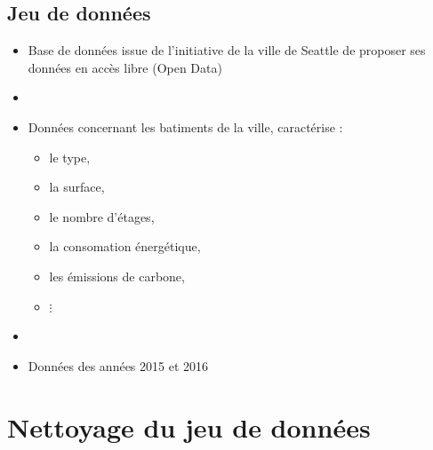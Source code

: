 \documentclass[8pt,aspectratio=169,hyperref={unicode=true}]{beamer}
\begin{document}
\subsection{Jeu de données}
\begin{frame}{\insertsubsection}
  \begin{itemize}
    \item Base de données issue de l'initiative de la ville de Seattle de proposer ses
          données en accès libre (Open Data)
    \item[]
    \item Données concernant les batiments de la ville, caractérise :
          \begin{itemize}
            \item le type,
            \item la surface,
            \item le nombre d'étages,
            \item la consomation énergétique,
            \item les émissions de carbone,
            \item $\vdots$
          \end{itemize}
    \item[]
    \item Données des années 2015 et 2016
  \end{itemize}
\end{frame}

\section{Nettoyage du jeu de données}
\end{document}
